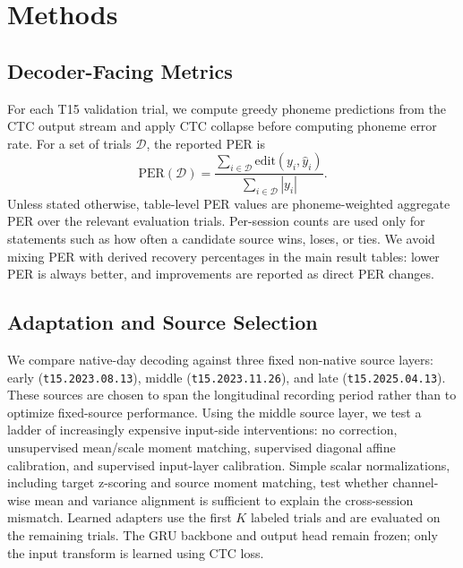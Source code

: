 \documentclass{article}
\begin{document}
\section{Methods}
\subsection{Decoder-Facing Metrics}
For each T15 validation trial, we compute greedy phoneme predictions from the CTC output stream and apply CTC collapse before computing phoneme error rate. For a set of trials $\mathcal{D}$, the reported PER is
\[
    \mathrm{PER}(\mathcal{D}) =
    \frac{\sum_{i \in \mathcal{D}} \mathrm{edit}(y_i,\hat{y}_i)}
         {\sum_{i \in \mathcal{D}} |y_i|}.
\]
Unless stated otherwise, table-level PER values are phoneme-weighted aggregate PER over the relevant evaluation trials. Per-session counts are used only for statements such as how often a candidate source wins, loses, or ties. We avoid mixing PER with derived recovery percentages in the main result tables: lower PER is always better, and improvements are reported as direct PER changes.

\subsection{Adaptation and Source Selection}
We compare native-day decoding against three fixed non-native source layers: early (\texttt{t15.2023.08.13}), middle (\texttt{t15.2023.11.26}), and late (\texttt{t15.2025.04.13}). These sources are chosen to span the longitudinal recording period rather than to optimize fixed-source performance. Using the middle source layer, we test a ladder of increasingly expensive input-side interventions: no correction, unsupervised mean/scale moment matching, supervised diagonal affine calibration, and supervised input-layer calibration. Simple scalar normalizations, including target z-scoring and source moment matching, test whether channel-wise mean and variance alignment is sufficient to explain the cross-session mismatch. Learned adapters use the first $K$ labeled trials and are evaluated on the remaining trials. The GRU backbone and output head remain frozen; only the input transform is learned using CTC loss.
\end{document}
